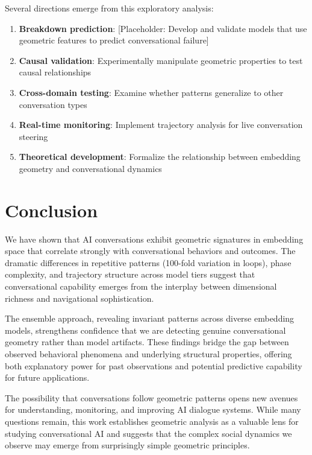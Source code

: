 \documentclass[11pt,letterpaper]{article}
\begin{document}
Several directions emerge from this exploratory analysis:

\begin{enumerate}
\item \textbf{Breakdown prediction}: [Placeholder: Develop and validate models that use geometric features to predict conversational failure]
\item \textbf{Causal validation}: Experimentally manipulate geometric properties to test causal relationships
\item \textbf{Cross-domain testing}: Examine whether patterns generalize to other conversation types
\item \textbf{Real-time monitoring}: Implement trajectory analysis for live conversation steering
\item \textbf{Theoretical development}: Formalize the relationship between embedding geometry and conversational dynamics
\end{enumerate}

\section{Conclusion}

We have shown that AI conversations exhibit geometric signatures in embedding space that correlate strongly with conversational behaviors and outcomes. The dramatic differences in repetitive patterns (100-fold variation in loops), phase complexity, and trajectory structure across model tiers suggest that conversational capability emerges from the interplay between dimensional richness and navigational sophistication.

The ensemble approach, revealing invariant patterns across diverse embedding models, strengthens confidence that we are detecting genuine conversational geometry rather than model artifacts. These findings bridge the gap between observed behavioral phenomena and underlying structural properties, offering both explanatory power for past observations and potential predictive capability for future applications.

The possibility that conversations follow geometric patterns opens new avenues for understanding, monitoring, and improving AI dialogue systems. While many questions remain, this work establishes geometric analysis as a valuable lens for studying conversational AI and suggests that the complex social dynamics we observe may emerge from surprisingly simple geometric principles.



\end{document}
